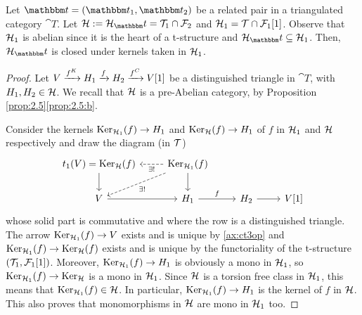 \begin{lemma}\label{lem:thm:2.9}
  Let $\t= (\t_1,\t_2)$ be a related pair in a triangulated category $\cat{T}$. Let $\clH:=\clH_\t=\T_1\cap \F_2$ and $\mathcal{H}_1=\mathcal{T}\cap \mathcal{F}_1[1]$. Observe that $\mathcal{H}_1$ is abelian since it is the heart of a t-structure and $\clH_\t\subseteq \clH_1$. Then, $\clH_\t$ is closed under kernels taken in $\mathcal{H}_1$.
\end{lemma}
\begin{proof}
  Let $V\xrightarrow{f^K}H_1\xrightarrow{f}H_2\xrightarrow{f^C}V[1]$ be a distinguished triangle in $\cat{T}$, with $H_1,H_2\in\mathcal{H}$. We recall that $\mathcal{H}$ is a pre-Abelian category, by Proposition \ref{prop:2.5}\ref{prop:2.5:b}.

  Consider the kernels $\operatorname{Ker}_{\mathcal{H}_1}(f)\to H_1$ and $\operatorname{Ker}_{\mathcal{H}}(f)\to H_1$ of $f$ in $\mathcal{H}_1$ and $\mathcal{H}$ respectively and draw the diagram (in $\mathcal{T}$)
  \begin{equation*}
    \begin{tikzcd}
      t_1(V)=\Ker_\clH(f)\arrow{d}
      & \Ker_{\clH_1}(f)\arrow{d}\arrow[dashed]{dl}{\exists !}\arrow[dashed]{l}{\exists !}
        & &\\
      V\arrow{r}
      & H_1\arrow{r}{f}
      & H_2\arrow{r}
      & V[1]
    \end{tikzcd}
  \end{equation*}
  whose solid part is commutative and where the row is a distinguished triangle. The arrow $\operatorname{Ker}_{\mathcal{H}_1}(f)\to V$ exists and is unique by \ref{ax:ct3op} and $\operatorname{Ker}_{\mathcal{H}_1}(f)\to \operatorname{Ker}_{\mathcal{H}}(f)$ exists and is unique by the functoriality of the t-structure $(\mathcal{T}_1,\mathcal{F}_1[1])$. Moreover, $\operatorname{Ker}_{\mathcal{H}_1}(f) \to H_1$ is obviously a mono in $\mathcal{H}_1$, so $\operatorname{Ker}_{\mathcal{H}_1}(f)\to \operatorname{Ker}_{\mathcal{H}}$ is a mono in $\mathcal{H}_1$. Since $\mathcal{H}$ is a torsion free class in $\mathcal{H}_1$, this means that $\operatorname{Ker}_{\mathcal{H}_1}(f)\in\mathcal{H}$. In particular, $\operatorname{Ker}_{\mathcal{H}_1}(f)\to H_1$ is the kernel of $f$ in $\mathcal{H}$. This also proves that monomorphisms in $\mathcal{H}$ are mono in $\mathcal{H}_1$ too.
\end{proof}

